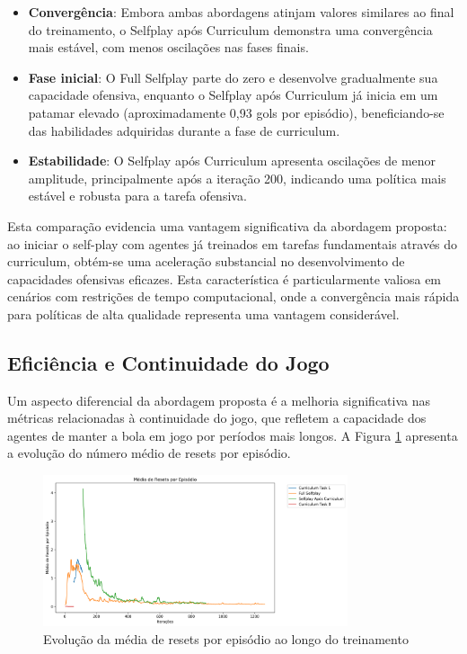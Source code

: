 \begin{itemize}
    \item \textbf{Convergência}: Embora ambas abordagens atinjam valores similares ao final do treinamento, o Selfplay após Curriculum demonstra uma convergência mais estável, com menos oscilações nas fases finais.
    
    \item \textbf{Fase inicial}: O Full Selfplay parte do zero e desenvolve gradualmente sua capacidade ofensiva, enquanto o Selfplay após Curriculum já inicia em um patamar elevado (aproximadamente 0,93 gols por episódio), beneficiando-se das habilidades adquiridas durante a fase de curriculum.
    
    \item \textbf{Estabilidade}: O Selfplay após Curriculum apresenta oscilações de menor amplitude, principalmente após a iteração 200, indicando uma política mais estável e robusta para a tarefa ofensiva.
\end{itemize}

Esta comparação evidencia uma vantagem significativa da abordagem proposta: ao iniciar o self-play com agentes já treinados em tarefas fundamentais através do curriculum, obtém-se uma aceleração substancial no desenvolvimento de capacidades ofensivas eficazes. Esta característica é particularmente valiosa em cenários com restrições de tempo computacional, onde a convergência mais rápida para políticas de alta qualidade representa uma vantagem considerável.

\subsection{Eficiência e Continuidade do Jogo}

Um aspecto diferencial da abordagem proposta é a melhoria significativa nas métricas relacionadas à continuidade do jogo, que refletem a capacidade dos agentes de manter a bola em jogo por períodos mais longos. A Figura \ref{fig:total_resets} apresenta a evolução do número médio de resets por episódio.

\begin{figure}[H]
    \centering
    \includegraphics[width=0.8\textwidth]{fig/graficos_trabalho/graficos_experimentos/geral/custom_metricstotal_resets_mean.png}
    \caption{Evolução da média de resets por episódio ao longo do treinamento}
    \label{fig:total_resets}
\end{figure}

